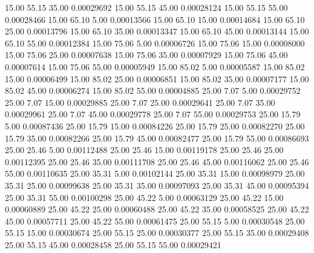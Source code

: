      15.00     55.15     35.00     0.00029692
     15.00     55.15     45.00     0.00028124
     15.00     55.15     55.00     0.00028466
     15.00     65.10      5.00     0.00013566
     15.00     65.10     15.00     0.00014684
     15.00     65.10     25.00     0.00013796
     15.00     65.10     35.00     0.00013347
     15.00     65.10     45.00     0.00013144
     15.00     65.10     55.00     0.00012384
     15.00     75.06      5.00     0.00006726
     15.00     75.06     15.00     0.00008000
     15.00     75.06     25.00     0.00007638
     15.00     75.06     35.00     0.00007929
     15.00     75.06     45.00     0.00007614
     15.00     75.06     55.00     0.00005949
     15.00     85.02      5.00     0.00005587
     15.00     85.02     15.00     0.00006499
     15.00     85.02     25.00     0.00006851
     15.00     85.02     35.00     0.00007177
     15.00     85.02     45.00     0.00006274
     15.00     85.02     55.00     0.00004885
     25.00      7.07      5.00     0.00029752
     25.00      7.07     15.00     0.00029885
     25.00      7.07     25.00     0.00029641
     25.00      7.07     35.00     0.00029961
     25.00      7.07     45.00     0.00029778
     25.00      7.07     55.00     0.00029753
     25.00     15.79      5.00     0.00087436
     25.00     15.79     15.00     0.00084226
     25.00     15.79     25.00     0.00082270
     25.00     15.79     35.00     0.00082266
     25.00     15.79     45.00     0.00082477
     25.00     15.79     55.00     0.00086693
     25.00     25.46      5.00     0.00112488
     25.00     25.46     15.00     0.00119178
     25.00     25.46     25.00     0.00112395
     25.00     25.46     35.00     0.00111708
     25.00     25.46     45.00     0.00116062
     25.00     25.46     55.00     0.00110635
     25.00     35.31      5.00     0.00102144
     25.00     35.31     15.00     0.00098979
     25.00     35.31     25.00     0.00099638
     25.00     35.31     35.00     0.00097093
     25.00     35.31     45.00     0.00095394
     25.00     35.31     55.00     0.00100298
     25.00     45.22      5.00     0.00063129
     25.00     45.22     15.00     0.00060889
     25.00     45.22     25.00     0.00060488
     25.00     45.22     35.00     0.00058525
     25.00     45.22     45.00     0.00057711
     25.00     45.22     55.00     0.00061475
     25.00     55.15      5.00     0.00030548
     25.00     55.15     15.00     0.00030674
     25.00     55.15     25.00     0.00030377
     25.00     55.15     35.00     0.00029408
     25.00     55.15     45.00     0.00028458
     25.00     55.15     55.00     0.00029421
